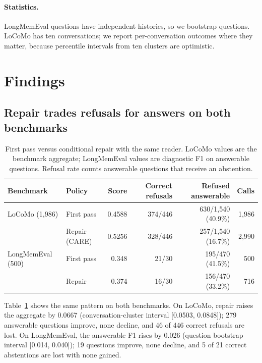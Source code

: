 \documentclass[11pt]{article}
\newcommand{\care}{\textsc{CARE}}
\begin{document}
\paragraph{Statistics.}
LongMemEval questions have independent histories, so we bootstrap questions.
LoCoMo has ten conversations; we report per-conversation outcomes where they
matter, because percentile intervals from ten clusters are optimistic.

\section{Findings}
\label{sec:findings}

\subsection{Repair trades refusals for answers on both benchmarks}
\label{sec:tradeoff}

\begin{table}[t]
\centering
\caption{First pass versus conditional repair with the same reader. LoCoMo
values are the benchmark aggregate; LongMemEval values are diagnostic F1 on
answerable questions. Refusal rate counts answerable questions that receive an
abstention.}
\label{tab:tradeoff}
\small
\begin{tabular}{llrrrr}
\toprule
Benchmark & Policy & Score & Correct refusals & Refused answerable & Calls \\
\midrule
LoCoMo (1,986) & First pass & 0.4588 & 374/446 & 630/1,540 (40.9\%) & 1,986 \\
               & Repair (\care{}) & 0.5256 & 328/446 & 257/1,540 (16.7\%) & 2,990 \\
LongMemEval (500) & First pass & 0.348 & 21/30 & 195/470 (41.5\%) & 500 \\
                  & Repair & 0.374 & 16/30 & 156/470 (33.2\%) & 716 \\
\bottomrule
\end{tabular}
\end{table}

Table~\ref{tab:tradeoff} shows the same pattern on both benchmarks. On LoCoMo,
repair raises the aggregate by 0.0667 (conversation-cluster interval
[0.0503, 0.0848]); 279 answerable questions improve, none decline, and 46 of
446 correct refusals are lost. On LongMemEval, the answerable F1 rises by
0.026 (question bootstrap interval [0.014, 0.040]); 19 questions improve, none
decline, and 5 of 21 correct abstentions are lost with none gained.
\end{document}
